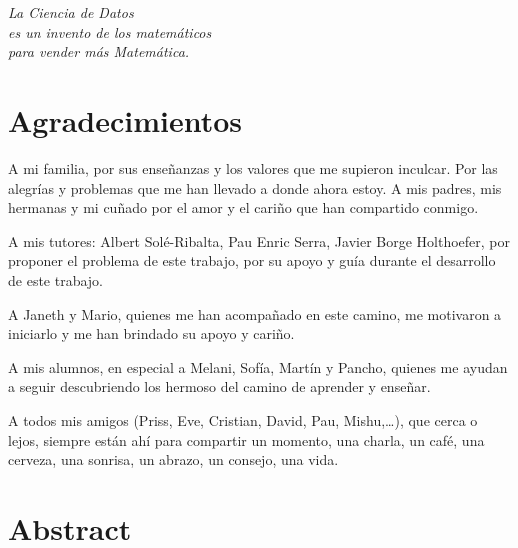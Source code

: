 \chapter*{}

\begin{raggedleft}
    \itshape La Ciencia de Datos\\ es un invento de los matemáticos\\ para vender más Matemática.\\
\end{raggedleft}

\chapter*{Agradecimientos}

A mi familia, por sus enseñanzas y los valores que me supieron inculcar. Por las alegrías y problemas que me han llevado a donde ahora estoy. A mis padres, mis hermanas y mi cuñado por el amor y el cariño que han compartido conmigo.

\vspace{\baselineskip}

A mis tutores: Albert Solé-Ribalta, Pau Enric Serra, Javier Borge
Holthoefer, por proponer el problema de este trabajo, por su apoyo y guía durante el desarrollo de este trabajo.

\vspace{\baselineskip}

A Janeth y Mario, quienes me han acompañado en este camino, me motivaron a iniciarlo y me han brindado su apoyo y cariño.

\vspace{\baselineskip}

A mis alumnos, en especial a Melani, Sofía, Martín y Pancho, quienes me ayudan a seguir descubriendo los hermoso del camino de aprender y enseñar. 

\vspace{\baselineskip}

A todos mis amigos (Priss, Eve, Cristian, David, Pau, Mishu,\dots), que cerca o lejos, siempre están ahí para compartir un momento, una charla, un café, una cerveza, una sonrisa, un abrazo, un consejo, una vida.

\chapter*{Abstract}

